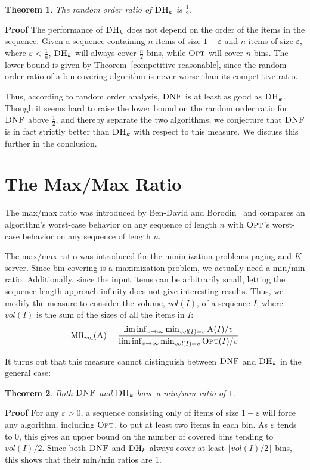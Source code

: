\documentclass[11pt]{article}
\newtheorem{xtheorem}{Theorem}
\newenvironment{theorem}{\begin{xtheorem}\rm}{\end{xtheorem}}
\newenvironment{proof}{\begin{trivlist}\item[]{\bf Proof }}{\hspace*{\fill}\raisebox{-1pt}{\boldmath$\Box$}\end{trivlist}}
\newcommand{\ALG}{\ensuremath{\operatorname{\textsc{A}}}\xspace}
\newcommand{\OPT}{\ensuremath{\operatorname{\textsc{Opt}}}\xspace}
\newcommand{\DNF}{\ensuremath{\operatorname{\textsc{DNF}}}\xspace}
\newcommand{\DHk}{{\ensuremath{\textsc{DH}_k}}\xspace}
\newcommand{\MINV}[1]{\ensuremath{\mathrm{MR_{vol}}(#1)}}
\newcommand{\vol}[1]{\ensuremath{\textit{vol}(#1)}\xspace}
\begin{document}
\begin{theorem}
The random order ratio of \DHk is $\frac{1}{2}$.
\end{theorem}

\begin{proof}
The performance of \DHk does not depend on the order of the items in the sequence. Given a sequence containing $n$ items of size $1-\varepsilon$ and $n$ items of size $\varepsilon$, where $\varepsilon < \frac{1}{n}$, \DHk will always cover $\frac{n}{2}$ bins, while \OPT will cover $n$ bins.
The lower bound is given by Theorem~\ref{competitive-reasonable},
since the random order ratio of a bin covering algorithm is never
worse than its competitive ratio.
\end{proof}

Thus, according to random order analysis, \DNF is at least as good as \DHk.
Though it seems hard to raise the lower bound on the random order
ratio for \DNF above $\frac{1}{2}$, and thereby separate the two
algorithms, we conjecture that \DNF is in fact strictly better than \DHk
with respect to this measure. We discuss this further in the conclusion.

\section{The Max/Max Ratio}
The max/max ratio was introduced by Ben-David and Borodin~\cite{BB94}
and compares an algorithm's worst-case behavior on any sequence of length $n$
with \OPT's worst-case behavior on any sequence of length $n$.

The max/max ratio was introduced for the minimization problems paging
and $K$-server. Since bin covering is a maximization problem,
we actually need a min/min ratio.
Additionally, since the input items can be arbitrarily small, letting
the sequence length approach infinity does not give interesting results.
Thus, we modify the measure to consider the volume, \vol{I}, of a
sequence $I$, where \vol{I} is the sum of the sizes of all the items in $I$:
\begin{align*}
\MINV{\ALG} = \dfrac{\liminf_{v\rightarrow\infty}\min_{\vol{I} = v} \ALG(I)/v}{\liminf_{v\rightarrow\infty}\min_{\vol{I} = v} \OPT(I)/v}
\end{align*}

It turns out that this measure cannot distinguish between \DNF and \DHk
in the general case:

\begin{theorem}
\label{max-not-separate}
Both \DNF and \DHk have a min/min ratio of $1$.
\end{theorem}
\begin{proof}
For any $\varepsilon >0$, a sequence consisting only of items of size
$1-\varepsilon$ will force any algorithm, including \OPT, to put at
least two items in each bin. As $\varepsilon$ tends to 0, this gives
an upper bound on the number of covered bins tending to $\vol{I}/2$.
Since both \DNF and \DHk always cover at least $\lfloor \vol{I}/2
\rfloor$ bins, this shows that their min/min ratios are $1$.
\end{proof}
\end{document}
